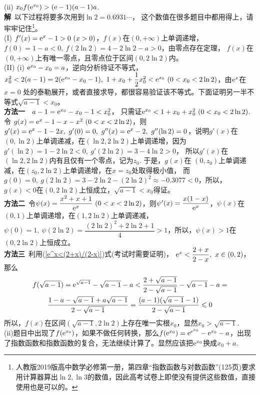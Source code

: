 \begin{enumerate}[label={【\textbf{例\thechapter.\arabic*}】},
 leftmargin=\inteval{\myenumleftmargin}pt,
 itemsep=\inteval{\myenumitempsep}pt,
 itemindent=\inteval{\myenumitemindent}pt]
(ii) $ x_0f(\mathrm{e}^{x_0})> (\mathrm{e}-1)(a-1)a $. \\
\textbf{解}\ 以下过程将要多次用到$ \ln 2=0.6931\cdots $，
这个数值在很多题目中都用得上，请牢牢记住\footnote{人教版2019版高中数学必修第一册，第四章“指数函数与对数函数”(125页)要求用计算器算出$ \ln 2,\ln 3 $的数值，因此高考试卷上即使没有提供这些数值，直接使用也是可以的。}。\\
(I) $ f'(x)=\e^x-1>0\ (x>0) $，$ f(x) $在$ (0,+\infty) $上单调递增，
$ f(0)=1-a<0,\ f(2\ln 2)=4-2\ln 2-a>0 $，由零点存在定理，
$ f(x) $在$ (0,+\infty) $上有唯一零点，且零点位于区间$ (0,2\ln2) $内。\\
(II) (i) $ \mathrm{e}^{x_0}-x_0=a $，逆向分析待证不等式，$ x_0^2<2(a-1)=2(\mathrm{e}^{x_0}
-x_0-1),\ 1+x_0+\dfrac{1}{2}x_0^2< \mathrm{e}^{x_0}\ (0<x_0<2\ln 2) $，由$ \mathrm{e}^x $在$ x=0 $
处的泰勒展开，或者直接求导，都很容易验证该不等式。下面证明另一半不等式$ \sqrt{a-1}< x_0 $。\\
\textbf{方法一}\ \ $ a-1=\mathrm{e}^{x_0}-x_0-1< x_0^2 $，
只需证$ \mathrm{e}^{x_0}< 1+x_0+x_0^2\ (0<x_0<2\ln 2) $. 令
$ g(x)=\e^x-1-x-x^2\ (0<x<2\ln 2) $，则$ g'(x)=\mathrm{e}^x-1-2x,\ g'(0)=0,\ g''(x)=
\mathrm{e}^x-2,\ g''(\ln 2)=0 $，说明$ g'(x) $在$ (0,\ln 2) $上单调递减，在$ (\ln2,
2\ln2) $上单调递增，因为$ g'(\ln2)=1-2\ln 2<0,\ g'(2\ln 2)=3-4\ln 2>0 $，
所以$ g'(x) $在$ (\ln2,2\ln2 ) $内有且仅有一个零点，记为$ z_0 $. 于是，$ g(x) $在
$ (0,z_0) $上单调递减，在$ (z_0,2\ln 2) $上单调递增，在$ x=z_0 $处取得极小值，
而$ g(0)=0,\ g(2\ln 2)=3-2\ln2-(2\ln2)^2\approx -0.3077<0 $，所以，
$ g(x)<0 $在$ (0,2\ln2) $上恒成立，$ \sqrt{a-1} < x_0 $得证。\\
\textbf{方法二}\ 令$ \psi(x)=\dfrac{x^2+x+1}{\mathrm{e}^x}\ (0<x<2\ln 2) $，则$ \psi'(x)=\dfrac{x(1-x)}{\mathrm{e}^x} $，$ \psi(x) $在$ (0,1) $上单调递增，在$ (1,2\ln2) $上单调递减，$ \psi(0)=1,\ \psi(2\ln 2)=\dfrac{(2\ln 2)^2+2\ln 2+1}{4}>1 $，所以，$ \psi(x)>1 $在$ (0,2\ln2) $上恒成立。\\
\textbf{方法三}\ 利用(\ref{e^x<(2+x)/(2-x)})式(考试时需要证明)，
$ \mathrm{e}^{x}<\dfrac{2+x}{2-x},\ x\in (0,2) $，那么
\begin{gather*}
    f(\sqrt{a-1})=\mathrm{e}^{\sqrt{a-1}}-\sqrt{a-1}-a<\dfrac{2+\sqrt{a-1}}{2-\sqrt{a-1}}
    -\sqrt{a-1}-a=\\ \dfrac{1-a-\sqrt{a-1}+a\sqrt{a-1}}{2-\sqrt{a-1}}=
    \dfrac{(a-1)(\sqrt{a-1}-1)}{2-\sqrt{a-1}}\leqslant 0
\end{gather*}
所以，$ f(x) $在区间$ (\sqrt{a-1},2\ln2) $上存在唯一实根$ x_0 $，显然$ x_0>\sqrt{a-1} $.\\
(ii)题目中出现了$ f(\mathrm{e}^{x_0}) $，如果不做任何转换，那么$ f(\mathrm{e}^{x_0})=\mathrm{e}^{\mathrm{e}^{x_0}}-
\mathrm{e}^{x_0}-a $，出现了指数函数和指数函数的复合，无法继续计算了。显然应该把$ \mathrm{e}^{x_0} $换成$ x_0+a $. 

\end{enumerate}
